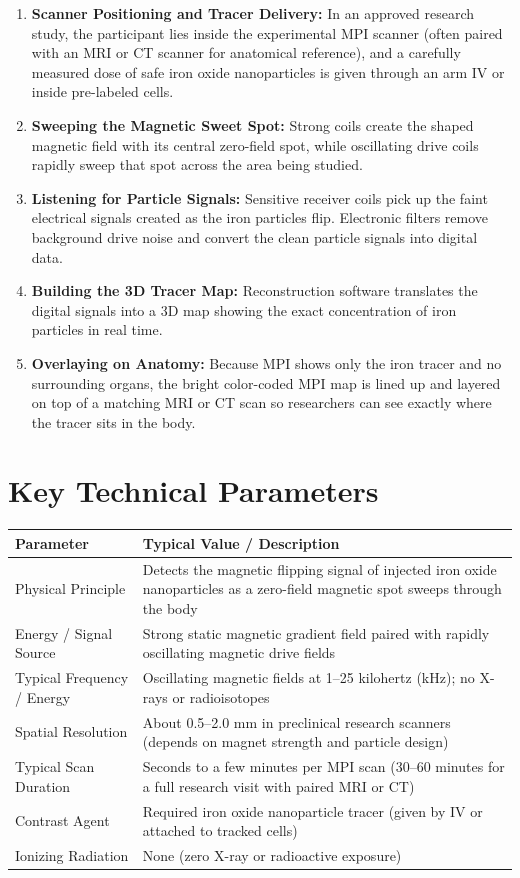 \begin{enumerate}
    \item \textbf{Scanner Positioning and Tracer Delivery:} In an approved research study, the participant lies inside the experimental MPI scanner (often paired with an MRI or CT scanner for anatomical reference), and a carefully measured dose of safe iron oxide nanoparticles is given through an arm IV or inside pre-labeled cells.
    \item \textbf{Sweeping the Magnetic Sweet Spot:} Strong coils create the shaped magnetic field with its central zero-field spot, while oscillating drive coils rapidly sweep that spot across the area being studied.
    \item \textbf{Listening for Particle Signals:} Sensitive receiver coils pick up the faint electrical signals created as the iron particles flip. Electronic filters remove background drive noise and convert the clean particle signals into digital data.
    \item \textbf{Building the 3D Tracer Map:} Reconstruction software translates the digital signals into a 3D map showing the exact concentration of iron particles in real time.
    \item \textbf{Overlaying on Anatomy:} Because MPI shows only the iron tracer and no surrounding organs, the bright color-coded MPI map is lined up and layered on top of a matching MRI or CT scan so researchers can see exactly where the tracer sits in the body.
\end{enumerate}

\section{Key Technical Parameters}

\noindent\begin{tabularx}{\textwidth}{@{}l X@{}}
\toprule
\textbf{Parameter} & \textbf{Typical Value / Description} \\
\midrule
Physical Principle & Detects the magnetic flipping signal of injected iron oxide nanoparticles as a zero-field magnetic spot sweeps through the body \\
Energy / Signal Source & Strong static magnetic gradient field paired with rapidly oscillating magnetic drive fields \\
Typical Frequency / Energy & Oscillating magnetic fields at 1--25 kilohertz (kHz); no X-rays or radioisotopes \\
Spatial Resolution & About 0.5--2.0 mm in preclinical research scanners (depends on magnet strength and particle design) \\
Typical Scan Duration & Seconds to a few minutes per MPI scan (30--60 minutes for a full research visit with paired MRI or CT) \\
Contrast Agent & Required iron oxide nanoparticle tracer (given by IV or attached to tracked cells) \\
Ionizing Radiation & None (zero X-ray or radioactive exposure) \\
\bottomrule
\end{tabularx}

